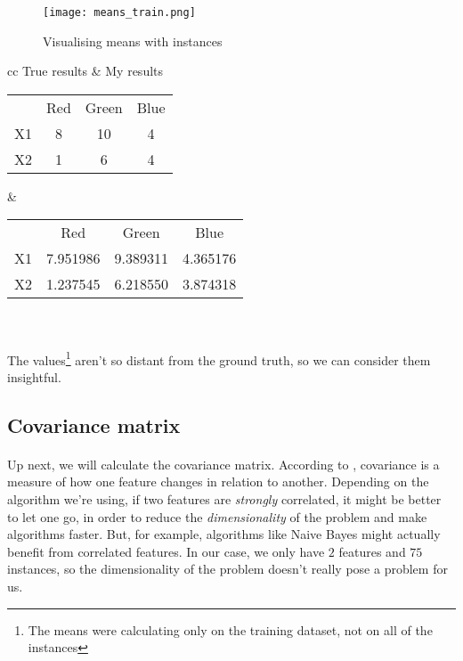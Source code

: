 \begin{figure}[H]
    \centering
    \texttt{[image: means\_train.png]}
    \caption{Visualising means with instances}
\end{figure}

\clearpage

\begin{center}
    \begin{tabular}{ cc }   %
        True results & My results \\  
        \begin{tabular}{ |c|c|c|c| } 
        \hline
        & Red & Green & Blue\\
        X1 & 8 & 10 & 4 \\
        X2 & 1 & 6 & 4 \\
        \hline
        \end{tabular} &  %
        \begin{tabular}{ |c|c|c|c| } 
        \hline
        & Red & Green & Blue\\
        X1 & 7.951986 & 9.389311 & 4.365176 \\
        X2 & 1.237545 & 6.218550 & 3.874318 \\
        \hline
        \end{tabular} \\
    \end{tabular}
\end{center}

\paragraph{}
The values\footnote{The means were calculating only on the training dataset, not on all of the instances} aren't so distant from the ground truth, so we can consider them insightful.

\subsection{Covariance matrix}

\paragraph{}
Up next, we will calculate the covariance matrix.
According to \cite{covariance}, covariance is a measure of how one feature changes in relation to another.
Depending on the algorithm we're using, if two features are \emph{strongly} correlated, it might be better to let one go, in order to reduce the \emph{dimensionality} of the problem and make algorithms faster.
But, for example, algorithms like Naive Bayes might actually benefit from correlated features.
In our case, we only have $2$ features and $75$ instances, so the dimensionality of the problem doesn't really pose a problem for us.


